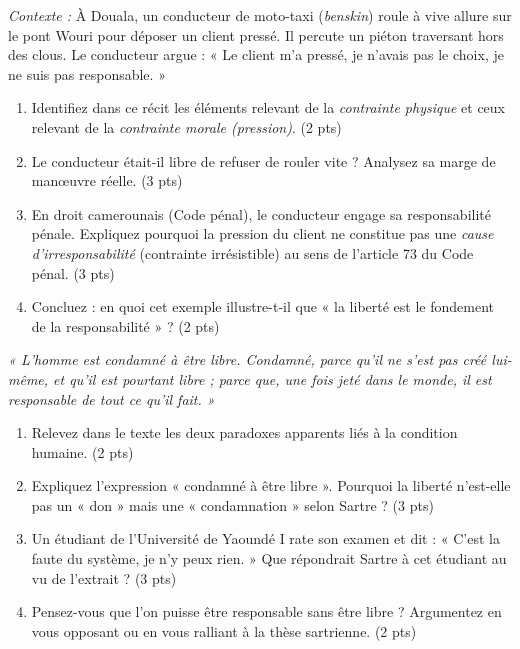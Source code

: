 \documentclass[11pt]{article}
\begin{document}
\begin{exercice}
    \textit{Contexte :} À Douala, un conducteur de moto-taxi (\textit{benskin}) roule à vive allure sur le pont Wouri pour déposer un client pressé. Il percute un piéton traversant hors des clous. Le conducteur argue : « Le client m'a pressé, je n'avais pas le choix, je ne suis pas responsable. »
    \begin{enumerate}
        \item Identifiez dans ce récit les éléments relevant de la \textit{contrainte physique} et ceux relevant de la \textit{contrainte morale (pression)}. (2 pts)
        \item Le conducteur était-il libre de refuser de rouler vite ? Analysez sa marge de manœuvre réelle. (3 pts)
        \item En droit camerounais (Code pénal), le conducteur engage sa responsabilité pénale. Expliquez pourquoi la pression du client ne constitue pas une \textit{cause d'irresponsabilité} (contrainte irrésistible) au sens de l'article 73 du Code pénal. (3 pts)
        \item Concluez : en quoi cet exemple illustre-t-il que « la liberté est le fondement de la responsabilité » ? (2 pts)
    \end{enumerate}
\end{exercice}

\begin{exercice}
    \textit{« L'homme est condamné à être libre. Condamné, parce qu'il ne s'est pas créé lui-même, et qu'il est pourtant libre ; parce que, une fois jeté dans le monde, il est responsable de tout ce qu'il fait. »}
    \begin{enumerate}
        \item Relevez dans le texte les deux paradoxes apparents liés à la condition humaine. (2 pts)
        \item Expliquez l'expression « condamné à être libre ». Pourquoi la liberté n'est-elle pas un « don » mais une « condamnation » selon Sartre ? (3 pts)
        \item Un étudiant de l'Université de Yaoundé I rate son examen et dit : « C'est la faute du système, je n'y peux rien. » Que répondrait Sartre à cet étudiant au vu de l'extrait ? (3 pts)
        \item Pensez-vous que l'on puisse être responsable sans être libre ? Argumentez en vous opposant ou en vous ralliant à la thèse sartrienne. (2 pts)
    \end{enumerate}
\end{exercice}
\end{document}
